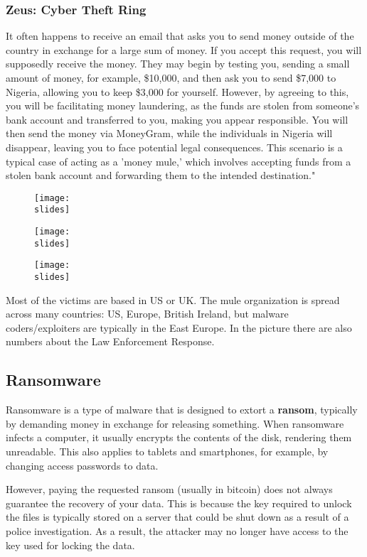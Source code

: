 \subsubsection{Zeus: Cyber Theft Ring}
It often happens to receive an email that asks you to send money outside of the country in exchange for a large sum of money.
If you accept this request, you will supposedly receive the money.
They may begin by testing you, sending a small amount of money, for example, \$10,000, and then ask you to send \$7,000 to Nigeria, allowing you to keep \$3,000 for yourself.
However, by agreeing to this, you will be facilitating money laundering, as the funds are stolen from someone's bank account and transferred to you, making you appear responsible.
You will then send the money via MoneyGram, while the individuals in Nigeria will disappear, leaving you to face potential legal consequences. This scenario is a typical case of acting as a 'money mule,' which involves accepting funds from a stolen bank account and forwarding them to the intended destination."
\begin{figure}[H]
  \centering

  \texttt{[image: \\slides]}

  \texttt{[image: \\slides]}

  \texttt{[image: \\slides]}
\end{figure}


Most of the victims are based in US or UK. The
mule organization is spread across many countries:
US, Europe, British Ireland, but malware
coders/exploiters are typically in the East Europe.
In the picture there are also numbers about the Law
Enforcement Response.

\subsection{Ransomware}
Ransomware is a type of malware that is designed to extort a \textbf{ransom}, typically by demanding money in exchange for releasing something. When ransomware infects a computer, it usually encrypts the contents of the disk, rendering them unreadable. This also applies to tablets and smartphones, for example, by changing access passwords to data.

However, paying the requested ransom (usually in bitcoin) does not always guarantee the recovery of your data. This is because the key required to unlock the files is typically stored on a server that could be shut down as a result of a police investigation. As a result, the attacker may no longer have access to the key used for locking the data.

